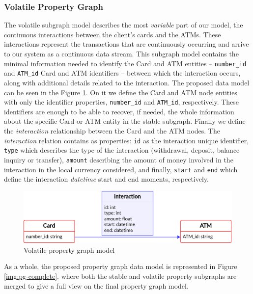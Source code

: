 \documentclass{article}
\begin{document}
\subsubsection{Volatile Property Graph}\label{section:volatile-pg}

The volatile subgraph model describes the most \emph{variable} part of our model, the continuous interactions between the client's cards and the ATMs. These interactions represent the transactions that are continuously occurring and arrive to our system as a continuous data stream. 
This subgraph model contains the minimal information needed to identify the Card and ATM entities -- \texttt{number\_id} and \texttt{ATM\_id} Card and ATM identifiers -- between which the interaction occurs, along with additional details related to the interaction. 
The proposed data model can be seen in the Figure \ref{img:pg-volatile}. On it we define the Card and ATM node entities with only the identifier properties, \texttt{number\_id} and \texttt{ATM\_id}, respectively. These identifiers are enough to be able to recover, if needed, the whole information about the specific Card or ATM entity in the stable subgraph.
Finally we define the \emph{interaction} relationship between the Card and the ATM nodes.
The \emph{interaction} relation contains as properties: \texttt{id} as the interaction unique identifier, \texttt{type} which describes the type of the interaction (withdrawal, deposit, balance inquiry or transfer), \texttt{amount} describing the amount of money involved in the interaction in the local currency considered, and finally, \texttt{start} and \texttt{end} which define the interaction \emph{datetime} start and end moments, respectively.

\begin{figure}[h]
    \centering
    \includegraphics[scale = 0.8]{images/schema-volatile.png}
    \caption{Volatile property graph model}
    \label{img:pg-volatile}
\end{figure}


As a whole, the proposed property graph data model is represented in Figure \ref{img:pg-complete}. where both the stable and volatile property subgraphs are merged to give a full view on the final property graph model.
\end{document}
